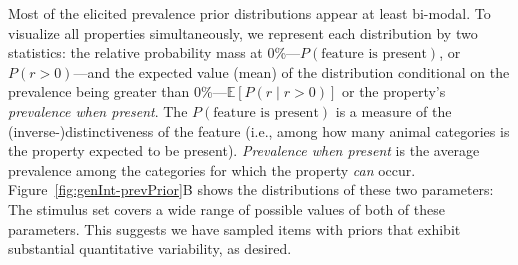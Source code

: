 \documentclass[floatsintext,doc]{apa6}
\begin{document}
Most of the elicited prevalence prior distributions appear at least bi-modal.
To visualize all properties simultaneously, we represent each distribution by two statistics: the relative probability mass at 0\%---\(P(\text{feature is present})\), or \(P(r > 0)\)---and the expected value (mean) of the distribution conditional on the prevalence being greater than 0\%---\(\mathbb{E}[P(r \mid r>0)]\) or the property's \emph{prevalence when present}.
The $P(\text{feature is present})$ is a measure of the (inverse-)distinctiveness of the feature (i.e., among how many animal categories is the property expected to be present). 
\emph{Prevalence when present} is the average prevalence among the categories for which the property \emph{can} occur. 
Figure~\ref{fig:genInt-prevPrior}B shows the distributions of these two parameters: The stimulus set covers a wide range of possible values of both of these parameters.
This suggests we have sampled items with priors that exhibit  substantial quantitative variability, as desired.
\end{document}

